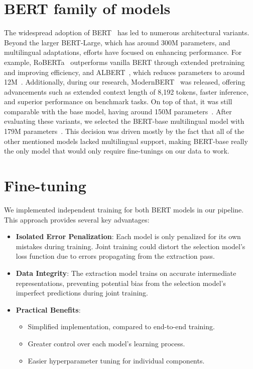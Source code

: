 \documentclass[licencjacka,en]{pracamgr}
\begin{document}
\section{BERT family of models}
The widespread adoption of BERT~\cite{BERT_hf} has led to numerous architectural variants. Beyond the larger BERT-Large, which has around 300M parameters, and multilingual adaptations, efforts have focused on enhancing performance. For example, RoBERTa~\cite{RoBERTa} outperforms vanilla BERT through extended pretraining and improving efficiency, and ALBERT~\cite{ALBERT}, which reduces parameters to  around 12M~\cite{ALBERT_hf}.
Additionally, during our research, ModernBERT~\cite{ModernBERTPaper} was released, offering advancements such as extended context length of 8,192 tokens, faster inference, and superior performance on benchmark tasks. On top of that, it was still comparable with the base model, having around 150M parameters~\cite{ModernBERThf}.
After evaluating these variants, we selected the BERT-base multilingual model with 179M parameters~\cite{BERT_multiling}. This decision was driven mostly by the fact that all of the other mentioned models lacked multilingual support, making BERT-base really the only model that would only require fine-tunings on our data to work.

\section{Fine-tuning}
We implemented independent training for both BERT models in our pipeline. This approach provides several key advantages:

\begin{itemize}
    \item \textbf{Isolated Error Penalization}: Each model is only penalized for its own mistakes during training. Joint training could distort the selection model's loss function due to errors propagating from the extraction pass.

    \item \textbf{Data Integrity}: The extraction model trains on accurate intermediate representations, preventing potential bias from the selection model's imperfect predictions during joint training.

    \item \textbf{Practical Benefits}:
    \begin{itemize}
        \item Simplified implementation, compared to end-to-end training.
        \item Greater control over each model's learning process.
        \item Easier hyperparameter tuning for individual components.
    \end{itemize}
\end{itemize}
\end{document}
